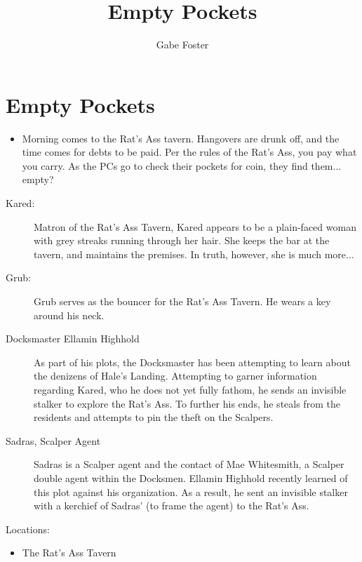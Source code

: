 \documentclass[11pt]{article}
\theoremstyle{definition}
\theoremstyle{remark}
\begin{document}
	\title{Empty Pockets}
	\date{\vspace{-24pt}}
	\author{Gabe Foster}
	\maketitle

\section{Empty Pockets}

\begin{description}

\item[Hooks:] 

\begin{itemize}

\item{Morning comes to the Rat's Ass tavern.  Hangovers are drunk off, and the time comes for debts to be paid.  Per the rules of the Rat's Ass, you pay what you carry.  As the PCs go to check their pockets for coin, they find them... empty?}

\end{itemize}

\item[NPCs:]
\begin{description}

\item[Kared:] Matron of the Rat's Ass Tavern, Kared appears to be a plain-faced woman with grey streaks running through her hair.  She keeps the bar at the tavern, and maintains the premises.  In truth, however, she is much more...

\item[Grub:] Grub serves as the bouncer for the Rat's Ass Tavern. He wears a key around his neck.

\item[Docksmaster Ellamin Highhold]

As part of his plots, the Docksmaster has been attempting to learn about the denizens of Hale's Landing. Attempting to garner information regarding Kared, who he does not yet fully fathom, he sends an invisible stalker to explore the Rat's Ass.  To further his ends, he steals from the residents and attempts to pin the theft on the Scalpers.

\item[Sadras, Scalper Agent]

Sadras is a Scalper agent and the contact of Mae Whitesmith, a Scalper double agent within the Docksmen.  Ellamin Highhold recently learned of this plot against his organization. As a result, he sent an invisible stalker with a kerchief of Sadras' (to frame the agent) to the Rat's Ass.

\end{description}

\item{Locations:}

\begin{itemize}

\item{The Rat's Ass Tavern}

\end{itemize}

\end{description}
\end{document}
